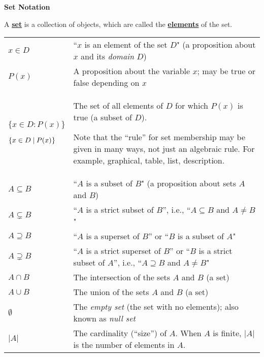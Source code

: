 \documentclass[11pt]{article}
\newcommand\st{:}
\renewcommand\emph[1]{\underline{\bf{#1}}} %
\theoremstyle{definition}
\begin{document}
{\bf Set Notation}

 A \emph{set} is a collection of objects, which are called the \emph{elements} of the set.


\vspace*{8pt}
\begin{tabular}{L{1in}L{5in}}
$x\in D$ & ``$x$ is an element of the set $D$"  (a proposition about $x$ and its {\it domain} $D$)\\

$P(x)$ & A proposition about the variable $x$; may be true or false depending on $x$ \\

$\{x \in D\st P(x)\}$ 

$\{x\in D \hspace*{2.5pt}|\hspace*{2.5pt} P(x)\hspace*{.25pt}\}$ & The set of all elements of $D$ for which $P(x)$ is true (a subset of $D$). 

Note that the ``rule'' for set membership may be given in many ways, not just an algebraic rule. For example, graphical, table, list, description.\\ 

$A \subseteq B$ & ``$A$ is a subset of $B$"  (a proposition about sets $A$ and $B$)\\

$A \subsetneq B$ & ``$A$ is a strict subset of $B$'', i.e., ``$A\subseteq B$ and $A \neq B$" \\
$A \supseteq B$ & ``$A$ is a superset of $B$'' or ``$B$ is a subset of $A$" \\

$A \supsetneq B$ &  ``$A$ is a strict superset of $B$'' or ``$B$ is a strict subset of $A$'',  i.e., ``$A\supseteq B$ and $A \neq B$"   \\ 


$A \cap B$ & The intersection of the sets $A$ and $B$  (a set)\\

$A \cup B$ & The union of the sets $A$ and $B$  (a set)\\

$\emptyset$ & The {\it empty set} (the set with no elements); also known as {\it null set}\\
$|A|$ & The cardinality (``size'') of $A$. When $A$ is finite, $|A|$ is the number of elements in $A$.
\end{tabular}
\end{document}
